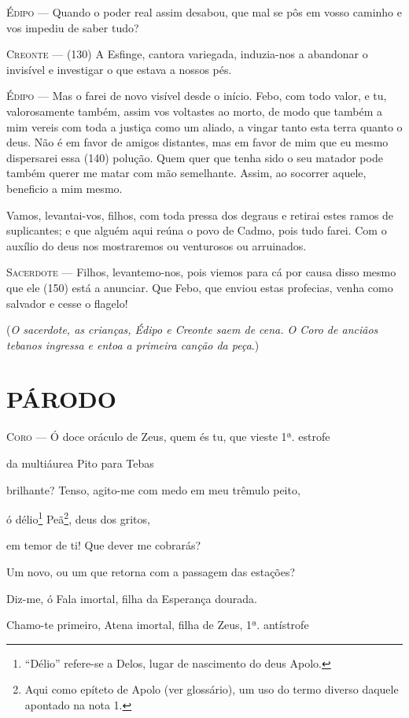 \textsc{Édipo} --- Quando o poder real assim desabou, que mal se pôs em vosso caminho e vos
impediu de saber tudo?

\textsc{Creonte} --- (130) A Esfinge, cantora variegada, induzia-nos a abandonar o invisível
e investigar o que estava a nossos pés.

\textsc{Édipo} --- Mas o farei de novo visível desde o início. Febo, com todo valor, e tu,
valorosamente também, assim vos voltastes ao morto, de modo que também a
mim vereis com toda a justiça como um aliado, a vingar tanto esta terra
quanto o deus. Não é em favor de amigos distantes, mas em favor de mim
que eu mesmo dispersarei essa (140) polução. Quem quer que tenha sido o
seu matador pode também querer me matar com mão semelhante. Assim, ao
socorrer aquele, beneficio a mim mesmo.

Vamos, levantai-vos, filhos, com toda pressa dos degraus e retirai estes
ramos de suplicantes; e que alguém aqui reúna o povo de Cadmo, pois tudo
farei. Com o auxílio do deus nos mostraremos ou venturosos ou
arruinados.

\textsc{Sacerdote} --- Filhos, levantemo-nos, pois viemos para cá por causa disso mesmo que ele
(150) está a anunciar. Que Febo, que enviou estas profecias, venha como
salvador e cesse o flagelo!

(\emph{O sacerdote, as crianças, Édipo e Creonte saem de cena. O Coro de
anciãos tebanos ingressa e entoa a primeira canção da peça}.)

\section{PÁRODO}

\textsc{Coro} --- Ó doce oráculo de Zeus, quem és tu, que vieste 1ª. estrofe

da multiáurea Pito para Tebas

brilhante? Tenso, agito-me com medo em meu trêmulo peito,

ó délio\footnote{``Délio'' refere-se a Delos, lugar de nascimento do
  deus Apolo.} Peã\footnote{Aqui como epíteto de Apolo (ver glossário),
  um uso do termo diverso daquele apontado na nota 1.}, deus dos gritos,

em temor de ti! Que dever me cobrarás?

Um novo, ou um que retorna com a passagem das estações?

Diz-me, ó Fala imortal, filha da Esperança dourada.

Chamo-te primeiro, Atena imortal, filha de Zeus, 1ª. antístrofe

